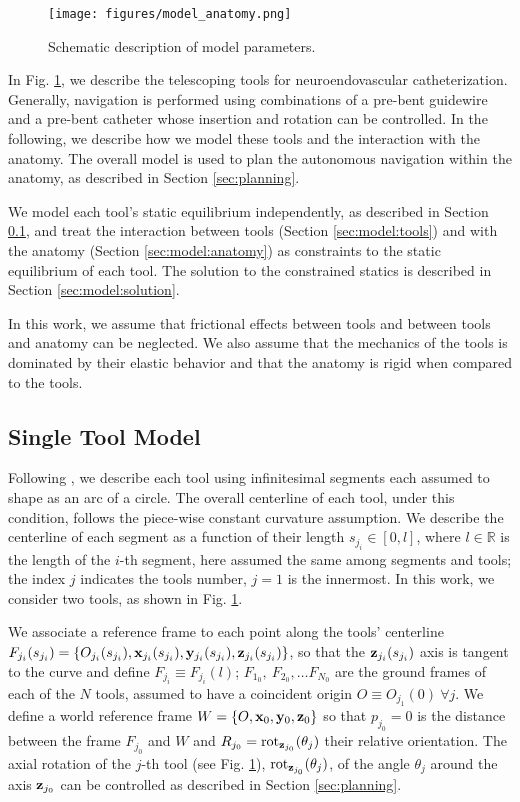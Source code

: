 \begin{figure}
    \centering
    \texttt{[image: figures/model\_anatomy.png]}
    \caption{Schematic description of model parameters.}
    \label{fig:model}
\end{figure}

In Fig. \ref{fig:model}, we describe the telescoping tools for neuroendovascular catheterization. Generally, navigation is performed using combinations of a pre-bent guidewire and a pre-bent catheter whose insertion and rotation can be controlled. In the following, we describe how we model these tools and the interaction with the anatomy. The overall model is used to plan the autonomous navigation within the anatomy, as described in Section \ref{sec:planning}.

We model each tool's static equilibrium independently, as described in Section \ref{sec:model:single}, and treat the interaction between tools (Section \ref{sec:model:tools}) and with the anatomy (Section \ref{sec:model:anatomy}) as constraints to the static equilibrium of each tool. The solution to the constrained statics is described in Section \ref{sec:model:solution}.

In this work, we assume that frictional effects between tools and between tools and anatomy can be neglected. We also assume that the mechanics of the tools is dominated by their elastic behavior and that the anatomy is rigid when compared to the tools.

\subsection{Single Tool Model}
\label{sec:model:single}
Following \cite{Pittiglio2023ClosedRobots}, we describe each tool using infinitesimal segments each assumed to shape as an arc of a circle. The overall centerline of each tool, under this condition, follows the piece-wise constant curvature assumption. We describe the centerline of each segment as a function of their length $s_{j_i} \in [0, l]$, where $l \in \mathbb{R}$ is the length of the $i$-th segment, here assumed the same among segments and tools; the index $j$ indicates the tools number, $j = 1$ is the innermost. In this work, we consider two tools, as shown in Fig. \ref{fig:model}.

We associate a reference frame to each point along the tools' centerline $F_{j_i}(s_{j_i})=\left\{O_{j_i}(s_{j_i}), \mathbf{x}_{j_i}(s_{j_i}), \mathbf{y}_{j_i}(s_{j_i}), \mathbf{z}_{j_i}(s_{j_i})\right\}$, so that the $\mathbf{z}_{j_i}(s_{j_i})$ axis is tangent to the curve and define $F_{j_i} \equiv F_{j_i}(l)$; $F_{1_0}, \ F_{2_0}, \dots F_{N_0}$ are the ground frames of each of the $N$ tools, assumed to have a coincident origin $O \equiv O_{j_1}(0) \ \forall j$. We define a world reference frame $W = \left\{O, \mathbf{x}_0, \mathbf{y}_0, \mathbf{z}_0\right\}$ so that $p_{j_0} = 0$ is the distance between the frame $F_{j_0}$ and $W$ and $R_{j_0} = \text{rot}_{\mathbf{z}_{j_0}}(\theta_j)$ their relative orientation. The axial rotation of the $j$-th tool (see Fig. \ref{fig:model}), $\text{rot}_{\mathbf{z}_{j_0}}(\theta_j)$, of the angle $\theta_j$ around the axis $\mathbf{z}_{j_0}$ can be controlled as described in Section \ref{sec:planning}. 

